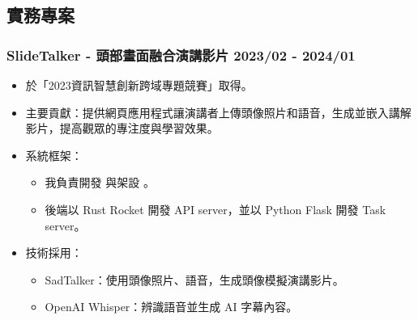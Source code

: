 \subsection*{實務專案}

\subsubsection*{SlideTalker - 頭部畫面融合演講影片 \hfill 2023/02 - 2024/01}
\begin{itemize}
    \item 於「2023資訊智慧創新跨域專題競賽」取得。
    \item 主要貢獻：提供網頁應用程式讓演講者上傳頭像照片和語音，生成並嵌入講解影片，提高觀眾的專注度與學習效果。
    \item 系統框架：
    \begin{itemize}
        \item 我負責開發 與架設 。
        \item 後端以 Rust Rocket 開發 API server，並以 Python Flask 開發 Task server。
    \end{itemize}
    \item 技術採用：
    \begin{itemize}
        \item SadTalker：使用頭像照片、語音，生成頭像模擬演講影片。
        \item OpenAI Whisper：辨識語音並生成 AI 字幕內容。
    \end{itemize}
\end{itemize}


